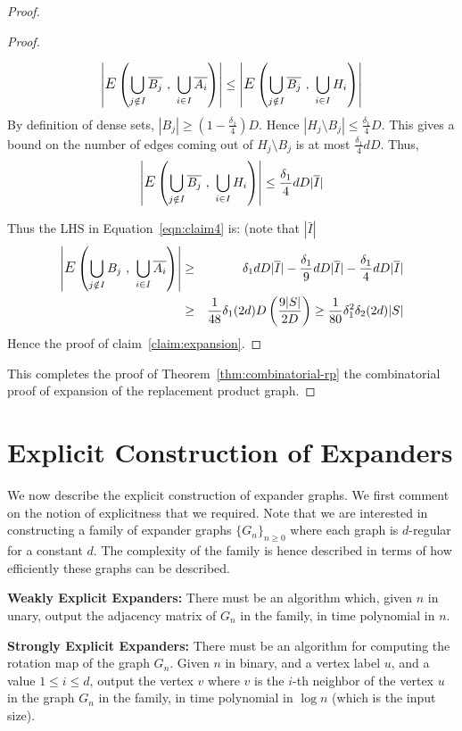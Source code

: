 \begin{proof}
\begin{description}
\begin{proof}
\begin{description}
$$\left| \mathlarger{E}\left(\bigcup_{j \notin I} \bar{B_j} ~,~\bigcup_{i \in I} \bar{A_i} \right) \right| \le 
\left| \mathlarger{E}\left(\bigcup_{j \notin I} \bar{B_j} ~,~\bigcup_{i \in I} H_i \right) \right| 
$$
By definition of dense sets, $|B_j| \ge (1-\frac{\delta_1}{4})D$. Hence $|H_j \setminus B_j| \le \frac{\delta_1}{4}D$. This gives a bound on the number of edges coming out of $H_j \setminus B_j$ is at most 
$\frac{\delta_1}{4}dD$.
Thus, $$\left| \mathlarger{E}\left(\bigcup_{j \notin I} \bar{B_j} ~,~\bigcup_{i \in I} H_i \right) \right| \le \frac{\delta_1}{4}dD|\bar{I}|$$
\end{description}
Thus the LHS in Equation~\ref{eqn:claim4} is: (note that $|\bar{I}| $
\begin{eqnarray*}
\left| \mathlarger{E}\left(\bigcup_{j \notin I} B_j~,~\bigcup_{i \in I} \bar{A_i} \right) \right| & \ge & \delta_1dD|\bar{I}| - \frac{\delta_1}{9}dD|\bar{I}|-
\frac{\delta_1}{4}dD|\bar{I}|\\
& \ge & \frac{1}{48}\delta_1 (2d) D \left(\frac{9|S|}{2D}\right) \ge \frac{1}{80}\delta_1^2 \delta_2 (2d) |S|
\end{eqnarray*}
Hence the proof of claim~\ref{claim:expansion}.
\end{proof}
\end{description}
This completes the proof of Theorem~\ref{thm:combinatorial-rp} the combinatorial proof of expansion of the replacement product graph.
\end{proof}

\section{Explicit Construction of Expanders}

We now describe the explicit construction of expander graphs. We first comment on the notion of explicitness that we required. Note that we are interested in constructing a family of expander graphs $\{G_n\}_{n \ge 0}$ where each graph is $d$-regular for a constant $d$. The complexity of the family is hence described in terms of how efficiently these graphs can be described.
\begin{description}
\item{\bf Weakly Explicit Expanders:} There must be an algorithm which, given $n$ in unary, output the adjacency matrix of $G_n$ in the family, in time polynomial in $n$.
\item{\bf Strongly Explicit Expanders:} There must be an algorithm for computing the rotation map of the graph $G_n$. Given $n$ in binary, and a vertex label $u$, and a value $1 \le i \le d$, output the vertex $v$ where $v$ is the $i$-th neighbor of the vertex $u$ in the graph $G_n$ in the family, in time polynomial in $\log n$ (which is the input size).
\end{description}

